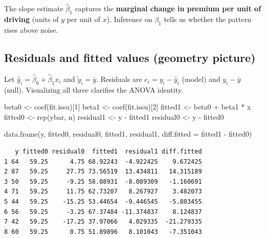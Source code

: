 \documentclass[
  letterpaper,
]{scrbook}
\newenvironment{Shaded}{\begin{snugshade}}{\end{snugshade}}
\newcommand{\AttributeTok}[1]{\textcolor[rgb]{0.40,0.45,0.13}{#1}}
\newcommand{\DecValTok}[1]{\textcolor[rgb]{0.68,0.00,0.00}{#1}}
\newcommand{\FunctionTok}[1]{\textcolor[rgb]{0.28,0.35,0.67}{#1}}
\newcommand{\NormalTok}[1]{\textcolor[rgb]{0.00,0.23,0.31}{#1}}
\newcommand{\OtherTok}[1]{\textcolor[rgb]{0.00,0.23,0.31}{#1}}
\newcommand{\SpecialCharTok}[1]{\textcolor[rgb]{0.37,0.37,0.37}{#1}}
\begin{document}
The slope estimate \(\hat\beta_1\) captures the \textbf{marginal change
in premium per unit of driving} (units of \(y\) per unit of \(x\)).
Inference on \(\beta_1\) tells us whether the pattern rises above noise.

\subsection{Residuals and fitted values (geometry
picture)}\label{residuals-and-fitted-values-geometry-picture}

Let \(\hat y_i=\hat\beta_0+\hat\beta_1 x_i\) and \(\tilde y_i=\bar y\).
Residuals are \(e_i=y_i-\hat y_i\) (model) and \(y_i-\bar y\) (null).
Visualizing all three clarifies the ANOVA identity.

\begin{Shaded}
\begin{Highlighting}[]
\NormalTok{beta0 }\OtherTok{\textless{}{-}} \FunctionTok{coef}\NormalTok{(fit.issu)[}\DecValTok{1}\NormalTok{]}
\NormalTok{beta1 }\OtherTok{\textless{}{-}} \FunctionTok{coef}\NormalTok{(fit.issu)[}\DecValTok{2}\NormalTok{]}
\NormalTok{fitted1 }\OtherTok{\textless{}{-}}\NormalTok{ beta0 }\SpecialCharTok{+}\NormalTok{ beta1 }\SpecialCharTok{*}\NormalTok{ x}
\NormalTok{fitted0 }\OtherTok{\textless{}{-}} \FunctionTok{rep}\NormalTok{(ybar, n)}
\NormalTok{residual1 }\OtherTok{\textless{}{-}}\NormalTok{ y }\SpecialCharTok{{-}}\NormalTok{ fitted1}
\NormalTok{residual0 }\OtherTok{\textless{}{-}}\NormalTok{ y }\SpecialCharTok{{-}}\NormalTok{ fitted0}

\FunctionTok{data.frame}\NormalTok{(y, fitted0, residual0, fitted1, residual1,}
           \AttributeTok{diff.fitted =}\NormalTok{ fitted1 }\SpecialCharTok{{-}}\NormalTok{ fitted0)}
\end{Highlighting}
\end{Shaded}

\begin{verbatim}
   y fitted0 residual0  fitted1  residual1 diff.fitted
1 64   59.25      4.75 68.92243  -4.922425    9.672425
2 87   59.25     27.75 73.56519  13.434811   14.315189
3 50   59.25     -9.25 58.08931  -8.089309   -1.160691
4 71   59.25     11.75 62.73207   8.267927    3.482073
5 44   59.25    -15.25 53.44654  -9.446545   -5.803455
6 56   59.25     -3.25 67.37484 -11.374837    8.124837
7 42   59.25    -17.25 37.97066   4.029335  -21.279335
8 60   59.25      0.75 51.89896   8.101043   -7.351043
\end{verbatim}
\end{document}
